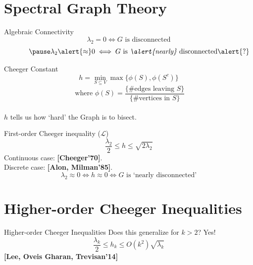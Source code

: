 \documentclass[aspectratio=169,xcolor=dvipsnames]{beamer}
\begin{document}
\section{Spectral Graph Theory}
\begin{frame}{Algebraic Connectivity}
\large
\[\lambda_2 = 0 \iff G \text{ is disconnected}\]
\[\hspace{3.1em}\pause\lambda_2 \alert{\approx} 0 \iff G \text{ is \emph{\alert{nearly}} disconnected\alert{?}}\]
\end{frame}

\begin{frame}{Cheeger Constant}
\vspace{-3em}
\centering
\Large
\[h = \min_{S \subseteq V} \max \{\phi(S), \phi(S^c)\}\]
\footnotesize
\[\text{ where } \phi(S) = \frac{\{\text{\# edges leaving } S\}}{\{\text{\# vertices in } S\}}\]
\normalsize
\vspace{1.5em} \\ $h$ tells us how `hard' the Graph is to bisect. 
\end{frame}

\begin{frame}{First-order Cheeger inequality ($\mathcal{L}$)}
\pause
\vspace{-1em}
\Large
\[
\frac{\lambda_2}{2} \le h \le \sqrt{2\lambda_2}
\]
\centering
\footnotesize Continuous case: \textbf{[Cheeger'70]}. \\ Discrete case: \textbf{[Alon, Milman'85]}.
\vspace{2em}
\normalsize
\pause
\[
\lambda_2 \approx 0 \iff h \approx 0 \iff G \text{ is `nearly disconnected'}
\]
\end{frame}

\section{Higher-order Cheeger Inequalities}
\begin{frame}{Higher-order Cheeger Inequalities}
\centering
Does this generalize for $k > 2$?
\pause
\alert{Yes!}
\[
\frac{\lambda_k}{2} \le h_k \le O(k^2)\sqrt{\lambda_k}
\]
\footnotesize
\textbf{[Lee, Oveis Gharan, Trevisan'14]}
\end{frame}
\end{document}
